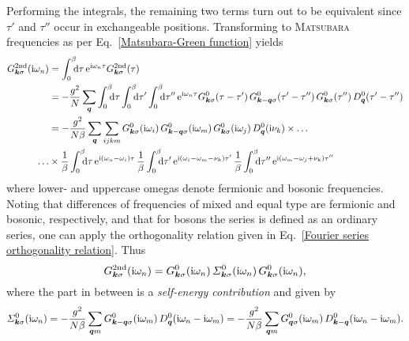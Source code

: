 Performing the integrals, the remaining two terms turn out to be equivalent
since $\tau'$ and $\tau''$ occur in exchangeable positions. Transforming to
\textsc{Matsubara} frequencies as per Eq.~\ref{Matsubara-Green function} yields
%
\begin{align*}
    G \super{2nd}_{\vec k \sigma}(\I \omega_n)
    &= \int \from 0 \till \beta \D \tau \,
    \E^{\I \omega_n \tau} G \super{2nd}_{\vec k \sigma}(\tau) \\
    &= -\frac {g^2} N \sum_{\vec q}
    \int \from 0 \till \beta \D \tau
    \int \from 0 \till \beta \D \tau'
    \int \from 0 \till \beta \D \tau'' \,
    \E^{\I \omega_n \tau}
    G^0_{\vec k \sigma}(\tau - \tau') \,
    G^0_{\vec k - \vec q \sigma}(\tau' - \tau'') \,
    G^0_{\vec k \sigma}(\tau'') \,
    D^0_{\vec q}(\tau' - \tau'') \\
    &= -\frac {g^2}{N \beta} \sum_{\vec q} \sum_{i j k m}
    G^0_{\vec k \sigma}(\I \omega_i) \,
    G^0_{\vec k - \vec q \sigma}(\I \omega_m) \,
    G^0_{\vec k \sigma}(\I \omega_j) \,
    D^0_{\vec q}(\I \nu_k) \times \dots \\
    \dots &\times
    \frac 1 \beta \int \from 0 \till \beta \D \tau \,
    \E^{\I (\omega_n - \omega_i) \tau} \,
    \frac 1 \beta \int \from 0 \till \beta \D \tau' \,
    \E^{\I (\omega_i - \omega_m - \nu_k) \tau'} \,
    \frac 1 \beta \int \from 0 \till \beta \D \tau'' \,
    \E^{\I (\omega_m - \omega_j + \nu_k) \tau''}
\end{align*}
%
where lower- and uppercase omegas denote fermionic and bosonic 
frequencies. Noting that differences of  frequencies of mixed
and equal type are fermionic and bosonic, respectively, and that for bosons the
 series is defined as an ordinary  series,
one can apply the orthogonality relation given in Eq.~\ref{Fourier series
orthogonality relation}. Thus
%
\begin{equation*}
    G \sp{\text{2nd}}_{\boldsymbol k \sigma}(\mathrm i \omega_n) =
    G^0_{\boldsymbol k \sigma}(\mathrm i \omega_n) \,
    \varSigma^0_{\boldsymbol k \sigma}(\mathrm i \omega_n) \,
    G^0_{\boldsymbol k \sigma}(\mathrm i \omega_n),
\end{equation*}
%
where the part in between is a \emph{self-energy contribution} and given by
%
\begin{equation*}
    \varSigma^0_{\boldsymbol k \sigma}(\mathrm i \omega_n)
    = -\frac {g^2}{N \beta} \sum_{\boldsymbol q m}
    G^0_{\boldsymbol k - \boldsymbol q \sigma}(\mathrm i \omega_m) \,
    D^0_{\boldsymbol q}(\mathrm i \omega_n - \mathrm i \omega_m)
    = -\frac {g^2}{N \beta} \sum_{\boldsymbol q m}
    G^0_{\boldsymbol q \sigma}(\mathrm i \omega_m) \,
    D^0_{\boldsymbol k - \boldsymbol q}(\mathrm i \omega_n - \mathrm i \omega_m).
\end{equation*}

